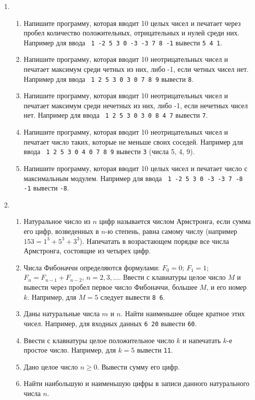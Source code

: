 \documentclass{article}
\begin{document}
\begin{enumerate}[label={}, leftmargin=0pt, itemindent=0pt]
\item
\begin{enumerate}[label=\arabic{enumi}.\arabic*.]
\item
Напишите программу, которая вводит 10 целых чисел и печатает через пробел количество положительных, отрицательных и нулей среди них. Например для ввода \texttt{ 1 -2 5 3 0 -3 -3 7 8 -1} вывести \texttt{5 4 1}.
\item
Напишите программу, которая вводит 10 неотрицательных чисел и печатает максимум среди четных из них, либо -1, если четных чисел нет. Например для ввода \texttt{ 1 2 5 3 0 3 0 7 8 9} вывести \texttt{8}.
\item
Напишите программу, которая вводит 10 неотрицательных чисел и печатает максимум среди нечетных из них, либо -1, если нечетных чисел нет. Например для ввода \texttt{ 1 2 5 3 0 3 0 8 4 7} вывести \texttt{7}.
\item
Напишите программу, которая вводит 10 неотрицательных чисел и печатает число таких, которые не меньше своих соседей. Например для ввода \texttt{ 1 2 5 3 0 4 0 7 8 9} вывести \texttt{3} (числа 5, 4, 9).
\item
Напишите программу, которая вводит 10 целых чисел и печатает число с максимальным модулем. Например для ввода \texttt{ 1 -2 5 3 0 -3 -3 7 -8 -1} вывести \texttt{-8}.
\end{enumerate}

\hrulefill
\item
\begin{enumerate}[label=\arabic{enumi}.\arabic*.]
\item
Натуральное число из $n$ цифр называется числом Армстронга, если сумма его цифр, возведенных в $n$-ю степень, равна самому числу (например $153=1^3+5^3+3^3$). Напечатать в возрастающем порядке все числа Армстронга, состоящие из четырех цифр.
\item
Числа Фибоначчи определяются формулами:
$F_0=0$; $F_1=1$; $F_n=F_{n-1}+F_{n-2}$, $n=2,3,\dots$. 
Ввести с клавиатуры целое число $M$ и вывести через пробел первое число Фибоначчи, большее $M$, и его номер $k$. Например, для $M=5$ следует вывести \texttt{8 6}.
\item
Даны натуральные числа $m$ и $n$. Найти наименьшее общее кратное этих чисел. Например, для входных данных \texttt{6 20} вывести \texttt{60}.
\item
Ввести с клавиатуры целое положительное число $k$ и напечатать $k$-е простое число. Например, для $k=5$ вывести \texttt{11}.
\item
Дано целое число $n\geqslant 0$. Вывести сумму его цифр.
\item
Найти наибольшую и наименьшую цифры в записи данного натурального числа $n$.
\end{enumerate}
\hrulefill



\end{enumerate}
\end{document}
